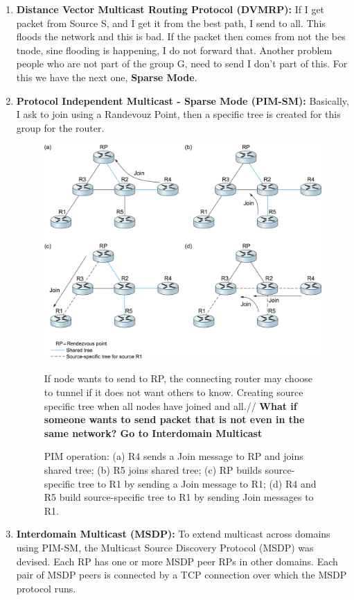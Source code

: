 \documentclass[11pt, a4paper]{article}
\begin{document}
\begin{enumerate}
    \item \textbf{Distance Vector Multicast Routing Protocol (DVMRP):} If I get packet from Source S, and I get it from the best path, I send to all. This floods the network and this is bad. If the packet then comes from not the bes tnode, sine flooding is happening, I do not forward that.
    Another problem people who are not part of the group G, need to send I don't part of this. For this we have the next one, \textbf{Sparse Mode}.
    \item \textbf{Protocol Independent Multicast - Sparse Mode (PIM-SM):}  Basically, I ask to join using a Randevouz Point, then a specific tree is created for this group for the router.
    \begin{figure}[H]
        \centering
        \includegraphics[width = \textwidth]{Pictures/PIM-SM.png}
        \caption{PIM operation: (a) R4 sends a Join message to RP and joins shared tree; (b) R5 joins shared tree; (c) RP builds source-specific tree to R1 by sending a Join message to R1; (d) R4 and R5 build source-specific tree to R1 by sending Join messages to R1.}
        If node wants to send to RP, the connecting router may choose to tunnel if it does not want others to know. Creating source specific tree when all nodes have joined and all.//
        \textbf{What if someone wants to send packet that is not even in the same network? Go to Interdomain Multicast}
    \end{figure}
    \item \textbf{Interdomain Multicast (MSDP):} To extend multicast across domains using PIM-SM, the Multicast Source Discovery Protocol (MSDP) was devised. Each RP has one or more MSDP peer RPs in other domains. Each pair of MSDP peers is connected by a TCP connection over which the MSDP protocol runs.

\end{enumerate}
\end{document}
